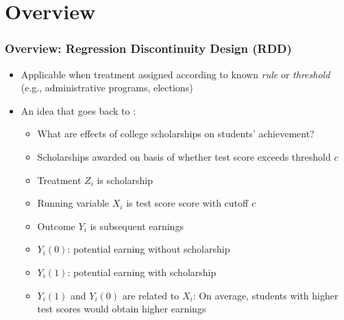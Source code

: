 \documentclass[table, xcolor = {dvipsnames}, 9pt]{beamer}
\theoremstyle{plain}
\begin{document}
\section{Overview}
\begin{frame}
\frametitle{Overview: Regression Discontinuity Design (RDD)} 
\begin{itemize} \vfill
\item Applicable when treatment assigned according to known
\textit{rule} or \textit{threshold} (e.g., administrative programs, elections) \vfill
\item An idea that goes back to \citet{thistlethwaitecampbell1960}: \vfill 
\begin{itemize} \vfill
\item What are effects of college scholarships on students' achievement? \vfill
\item Scholarships awarded on basis of whether test score exceeds threshold $c$ \vfill
\item Treatment $Z_i$ is scholarship \vfill
\item Running variable $X_i$ is test score score with cutoff $c$ \vfill
\item Outcome $Y_i$ is subsequent earnings \vfill
\item $Y_i(0)$: potential earning without scholarship \vfill
\item $Y_i(1)$: potential earning with scholarship \vfill
\item $Y_i(1)$ and $Y_i(0)$ are related to $X_i$: On average, students with higher test scores would obtain higher earnings \vfill
\end{itemize} \vfill
\end{itemize} \vfill
\end{frame}
\end{document}
